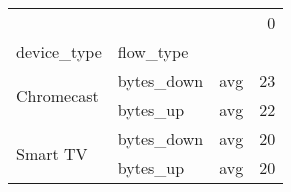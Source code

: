 \begin{tabular}{lllr}
\toprule
 &  &  & 0 \\
device_type & flow_type &  &  \\
\midrule
\multirow[t]{2}{*}{Chromecast} & bytes_down & avg & 23 \\
\cline{2-4}
 & bytes_up & avg & 22 \\
\cline{1-4} \cline{2-4}
\multirow[t]{2}{*}{Smart TV} & bytes_down & avg & 20 \\
\cline{2-4}
 & bytes_up & avg & 20 \\
\cline{1-4} \cline{2-4}
\bottomrule
\end{tabular}
